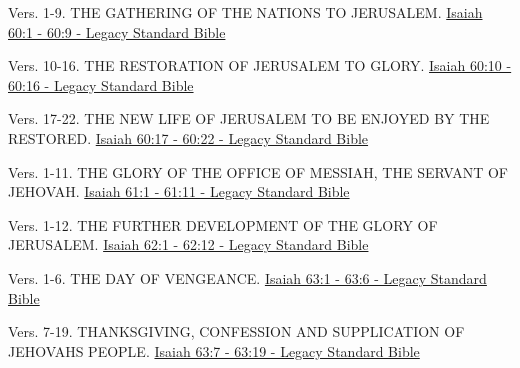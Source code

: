 \documentclass[
  ignorenonframetext,
]{beamer}
\begin{document}
\begin{frame}{60}
\label{section-68}
\begin{block}{Vers. 1-9. THE GATHERING OF THE NATIONS TO JERUSALEM.}
\label{vers.-1-9.-the-gathering-of-the-nations-to-jerusalem.}
\href{https://read.lsbible.org/?q=isa60\%3A1-9}{Isaiah 60:1 - 60:9 -
Legacy Standard Bible}
\end{block}

\begin{block}{Vers. 10-16. THE RESTORATION OF JERUSALEM TO GLORY.}
\label{vers.-10-16.-the-restoration-of-jerusalem-to-glory.}
\href{https://read.lsbible.org/?q=isa60\%3A10-16}{Isaiah 60:10 - 60:16 -
Legacy Standard Bible}
\end{block}

\begin{block}{Vers. 17-22. THE NEW LIFE OF JERUSALEM TO BE ENJOYED BY
THE RESTORED.}
\label{vers.-17-22.-the-new-life-of-jerusalem-to-be-enjoyed-by-the-restored.}
\href{https://read.lsbible.org/?q=isa60\%3A17-22}{Isaiah 60:17 - 60:22 -
Legacy Standard Bible}
\end{block}
\end{frame}

\begin{frame}{61}
\label{section-69}
\begin{block}{Vers. 1-11. THE GLORY OF THE OFFICE OF MESSIAH, THE
SERVANT OF JEHOVAH.}
\label{vers.-1-11.-the-glory-of-the-office-of-messiah-the-servant-of-jehovah.}
\href{https://read.lsbible.org/?q=isa61\%3A1-11}{Isaiah 61:1 - 61:11 -
Legacy Standard Bible}
\end{block}
\end{frame}

\begin{frame}{62}
\label{section-70}
\begin{block}{Vers. 1-12. THE FURTHER DEVELOPMENT OF THE GLORY OF
JERUSALEM.}
\label{vers.-1-12.-the-further-development-of-the-glory-of-jerusalem.}
\href{https://read.lsbible.org/?q=isa62\%3A1-12}{Isaiah 62:1 - 62:12 -
Legacy Standard Bible}
\end{block}
\end{frame}

\begin{frame}{63}
\label{section-71}
\begin{block}{Vers. 1-6. THE DAY OF VENGEANCE.}
\label{vers.-1-6.-the-day-of-vengeance.}
\href{https://read.lsbible.org/?q=isa63\%3A1-6}{Isaiah 63:1 - 63:6 -
Legacy Standard Bible}
\end{block}

\begin{block}{Vers. 7-19. THANKSGIVING, CONFESSION AND SUPPLICATION OF
JEHOVAH\textquotesingle S PEOPLE.}
\label{vers.-7-19.-thanksgiving-confession-and-supplication-of-jehovahs-people.}
\href{https://read.lsbible.org/?q=isa63\%3A7-19}{Isaiah 63:7 - 63:19 -
Legacy Standard Bible}
\end{block}
\end{frame}
\end{document}
